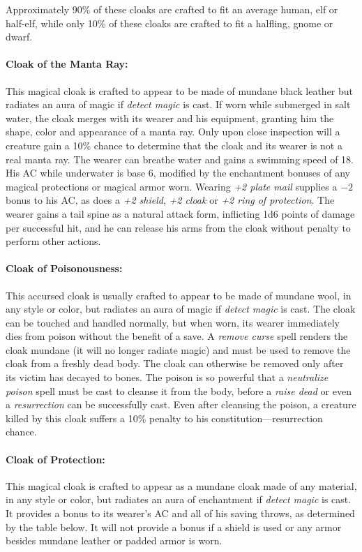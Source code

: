 \begin{multicols}{2}
Approximately 90\% of these cloaks are crafted to fit an average human, elf or half-elf, while only 10\% of these cloaks are crafted to fit a halfling, gnome or dwarf.

\paragraph{Cloak of the Manta Ray:} This magical cloak is crafted to appear to be made of mundane black leather but radiates an aura of magic if \textit{detect magic} is cast.  If worn while submerged in salt water, the cloak merges with its wearer and his equipment, granting him the shape, color and appearance of a manta ray.  Only upon close inspection will a creature gain a 10\% chance to determine that the cloak and its wearer is not a real manta ray.  The wearer can breathe water and gains a swimming speed of 18.  His AC while underwater is base 6, modified by the enchantment bonuses of any magical protections or magical armor worn.  Wearing \textit{+2 plate mail} supplies a $-2$ bonus to his AC, as does a \textit{+2 shield}, \textit{+2 cloak} or \textit{+2 ring of protection}.  The wearer gains a tail spine as a natural attack form, inflicting 1d6 points of damage per successful hit, and he can release his arms from the cloak without penalty to perform other actions.

\paragraph{Cloak of Poisonousness:} This accursed cloak is usually crafted to appear to be made of mundane wool, in any style or color, but radiates an aura of magic if \textit{detect magic} is cast.  The cloak can be touched and handled normally, but when worn, its wearer immediately dies from poison without the benefit of a save.  A \textit{remove curse} spell renders the cloak mundane (it will no longer radiate magic) and must be used to remove the cloak from a freshly dead body.  The cloak can otherwise be removed only after its victim has decayed to bones.  The poison is so powerful that a \textit{neutralize poison} spell must be cast to cleanse it from the body, before a \textit{raise dead} or even a \textit{resurrection} can be successfully cast.  Even after cleansing the poison, a creature killed by this cloak suffers a 10\% penalty to his constitution---resurrection chance.

\paragraph{Cloak of Protection:} This magical cloak is crafted to appear as a mundane cloak made of any material, in any style or color, but radiates an aura of enchantment if \textit{detect magic} is cast.  It provides a bonus to its wearer's AC and all of his saving throws, as determined by the table below.  It will not provide a bonus if a shield is used or any armor besides mundane leather or padded armor is worn.


\end{multicols}
